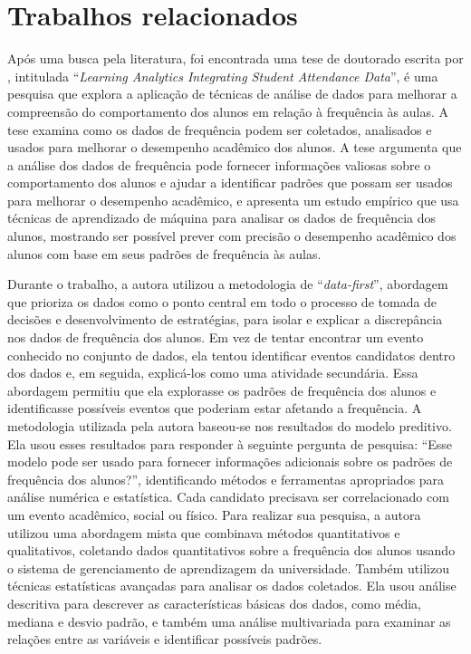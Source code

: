 \chapter{Trabalhos relacionados}

Após uma busca pela literatura, foi encontrada uma tese de doutorado escrita por , intitulada ``\textit{Learning Analytics Integrating Student Attendance Data}'', é uma pesquisa que explora a aplicação de técnicas de análise de dados para melhorar a compreensão do comportamento dos alunos em relação à frequência às aulas. A tese examina como os dados de frequência podem ser coletados, analisados e usados para melhorar o desempenho acadêmico dos alunos. A tese argumenta que a análise dos dados de frequência pode fornecer informações valiosas sobre o comportamento dos alunos e ajudar a identificar padrões que possam ser usados para melhorar o desempenho acadêmico, e apresenta um estudo empírico que usa técnicas de aprendizado de máquina para analisar os dados de frequência dos alunos, mostrando ser possível prever com precisão o desempenho acadêmico dos alunos com base em seus padrões de frequência às aulas.

Durante o trabalho, a autora utilizou a metodologia de ``\textit{data-first}'', abordagem que prioriza os dados como o ponto central em todo o processo de tomada de decisões e desenvolvimento de estratégias, para isolar e explicar a discrepância nos dados de frequência dos alunos. Em vez de tentar encontrar um evento conhecido no conjunto de dados, ela tentou identificar eventos candidatos dentro dos dados e, em seguida, explicá-los como uma atividade secundária. Essa abordagem permitiu que ela explorasse os padrões de frequência dos alunos e identificasse possíveis eventos que poderiam estar afetando a frequência. A metodologia utilizada pela autora baseou-se nos resultados do modelo preditivo. Ela usou esses resultados para responder à seguinte pergunta de pesquisa:  ``Esse modelo pode ser usado para fornecer informações adicionais sobre os padrões de frequência dos alunos?'', identificando métodos e ferramentas apropriados para análise numérica e estatística. Cada candidato precisava ser correlacionado com um evento acadêmico, social ou físico. Para realizar sua pesquisa, a autora utilizou uma abordagem mista que combinava métodos quantitativos e qualitativos, coletando dados quantitativos sobre a frequência dos alunos usando o sistema de gerenciamento de aprendizagem da universidade. Também utilizou técnicas estatísticas avançadas para analisar os dados coletados. Ela usou análise descritiva para descrever as características básicas dos dados, como média, mediana e desvio padrão, e também uma análise multivariada para examinar as relações entre as variáveis e identificar possíveis padrões.


